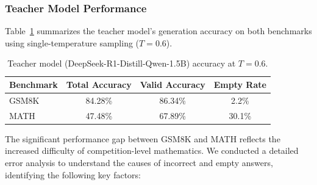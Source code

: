 \documentclass{article}
\begin{document}
\subsubsection{Teacher Model Performance}

Table~\ref{tab:teacher_perf} summarizes the teacher model's generation accuracy on both benchmarks using single-temperature sampling ($T = 0.6$).

\begin{table}[H]
\centering
\caption{Teacher model (DeepSeek-R1-Distill-Qwen-1.5B) accuracy at $T = 0.6$.}
\label{tab:teacher_perf}
\begin{tabular}{lccc}
\toprule
\textbf{Benchmark} & \textbf{Total Accuracy} & \textbf{Valid Accuracy} & \textbf{Empty Rate} \\
\midrule
GSM8K  & 84.28\% & 86.34\% & 2.2\% \\
MATH   & 47.48\% & 67.89\% & 30.1\% \\
\bottomrule
\end{tabular}
\end{table}

The significant performance gap between GSM8K and MATH reflects the increased difficulty of competition-level mathematics. We conducted a detailed error analysis to understand the causes of incorrect and empty answers, identifying the following key factors:
\end{document}
